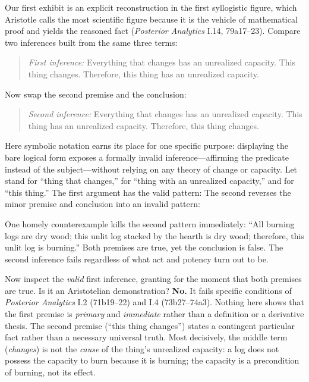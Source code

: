 Our first exhibit is an explicit reconstruction in the first syllogistic figure, which Aristotle calls the most scientific figure because it is the vehicle of mathematical proof and yields the reasoned fact (\emph{Posterior Analytics} I.14, 79a17--23). Compare two inferences built from the same three terms:

\begin{quote}
\emph{First inference:} Everything that changes has an unrealized capacity. This thing changes. Therefore, this thing has an unrealized capacity.
\end{quote}

Now swap the second premise and the conclusion:

\begin{quote}
\emph{Second inference:} Everything that changes has an unrealized capacity. This thing has an unrealized capacity. Therefore, this thing changes.
\end{quote}

Here symbolic notation earns its place for one specific purpose: displaying the bare logical form exposes a formally invalid inference---affirming the predicate instead of the subject---without relying on any theory of change or capacity. Let  stand for ``thing that changes,''  for ``thing with an unrealized capacity,'' and  for ``this thing.'' The first argument has the valid pattern:
The second reverses the minor premise and conclusion into an invalid pattern:

One homely counterexample kills the second pattern immediately: ``All burning logs are dry wood; this unlit log stacked by the hearth is dry wood; therefore, this unlit log is burning.'' Both premises are true, yet the conclusion is false. The second inference fails regardless of what act and potency turn out to be.

Now inspect the \emph{valid} first inference, granting for the moment that both premises are true. Is it an Aristotelian demonstration? \textbf{No.} It fails specific conditions of \emph{Posterior Analytics} I.2 (71b19--22) and I.4 (73b27--74a3). Nothing here shows that the first premise is \emph{primary} and \emph{immediate} rather than a definition or a derivative thesis. The second premise (``this thing changes'') states a contingent particular fact rather than a necessary universal truth. Most decisively, the middle term (\emph{changes}) is not the \emph{cause} of the thing's unrealized capacity: a log does not possess the capacity to burn because it is burning; the capacity is a precondition of burning, not its effect.

